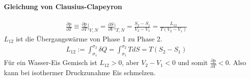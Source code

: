 
\vspace{-20pt}

\paragraph{Gleichung von Clausius-Clapeyron}
\begin{align*}
    \frac{\partial p}{\partial T} \equiv
    \frac{\partial p}{\partial T} \Big|_{V,N}
    = \frac{\partial S}{\partial V} \Big|_{T,N}
    = \frac{S_2 - S_1}{V_2 - V_1}
    = \frac{L_{12}}{T (V_2 - V_1)}
\end{align*}
$L_{12}$ ist die Übergangswärme von Phase 1 zu Phase 2.
\begin{align*}
    L_{12} := \int_{\sigma_1}^{\sigma_2} \delta Q
    = \int_{\sigma_1}^{\sigma_2} T dS = T (S_2 - S_1)
\end{align*}
Für ein Wasser-Eis Gemisch ist $L_{12} > 0$, aber $V_2 - V_1 < 0$ und
somit $\frac{\partial p}{\partial T} < 0$. Also kann bei isothermer
Druckzunahme Eis schmelzen.

